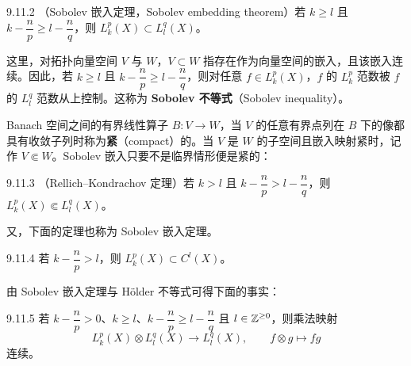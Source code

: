 \begin{theorem*}{9.11.2}
（Sobolev 嵌入定理，Sobolev embedding theorem）若 $k\ge l$ 且 $k-\dfrac np \ge l-\dfrac nq$，则 $L^p_k(X)\subset L^q_l(X)$。
\end{theorem*}

这里，对拓扑向量空间 $V$ 与 $W$，$V\subset W$ 指存在作为向量空间的嵌入，且该嵌入连续。因此，若 $k\ge l$ 且 $k-\dfrac np\ge l-\dfrac nq$，则对任意 $f\in L^p_k(X)$，$f$ 的 $L^p_k$ 范数被 $f$ 的 $L^q_l$ 范数从上控制。这称为 \textbf{Sobolev 不等式}（Sobolev inequality）。


Banach 空间之间的有界线性算子 $B\colon V\to W$，当 $V$ 的任意有界点列在 $B$ 下的像都具有收敛子列时称为\textbf{紧}（compact）的。当 $V$ 是 $W$ 的子空间且嵌入映射紧时，记作 $V\Subset W$。Sobolev 嵌入只要不是临界情形便是紧的：

\begin{theorem*}{9.11.3}
（Rellich--Kondrachov 定理）若 $k>l$ 且 $k-\dfrac np > l-\dfrac nq$，则 $L^p_k(X)\Subset L^q_l(X)$。
\end{theorem*}

又，下面的定理也称为 Sobolev 嵌入定理。

\begin{theorem*}{9.11.4}
若 $k-\dfrac np > l$，则 $L^p_k(X)\subset C^l(X)$。
\end{theorem*}

由 Sobolev 嵌入定理与 Hölder 不等式可得下面的事实：

\begin{theorem*}{9.11.5}
若 $k-\dfrac np>0$、$k\ge l$、$k-\dfrac np\ge l-\dfrac nq$ 且 $l\in\mathbb{Z}^{\ge0}$，则乘法映射
\begin{equation}
  L^p_k(X)\otimes L^q_l(X)\to L^q_l(X),\qquad f\otimes g\mapsto fg
  \tag{9.11.11}
\end{equation}
连续。
\end{theorem*}


